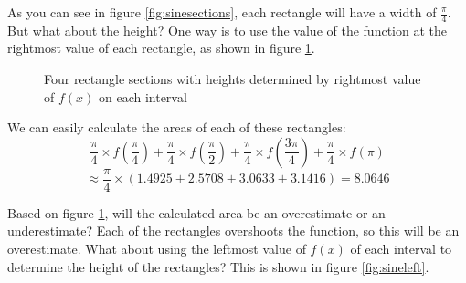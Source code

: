 As you can see in figure \ref{fig:sinesections}, each rectangle will have a width of $\frac{\pi}{4}$. But what about the height? One way is to use the value of the function at the rightmost value of each rectangle, as shown in figure \ref{fig:sineright}. 

\begin{figure}[htbp]
	\centering
	\caption{Four rectangle sections with heights determined by rightmost value of $f(x)$ on each interval}
	\label{fig:sineright}
\end{figure}

We can easily calculate the areas of each of these rectangles:
$$\frac{\pi}{4} \times f(\frac{\pi}{4}) + \frac{\pi}{4} \times f(\frac{\pi}{2}) + \frac{\pi}{4} \times  f(\frac{3\pi}{4}) + \frac{\pi}{4} \times f(\pi)$$
$$\approx \frac{\pi}{4} \times (1.4925 + 2.5708 + 3.0633 + 3.1416) = 8.0646$$

Based on figure \ref{fig:sineright}, will the calculated area be an overestimate or an underestimate? Each of the rectangles overshoots the function, so this will be an overestimate. What about using the leftmost value of $f(x)$ of each interval to determine the height of the rectangles? This is shown in figure \ref{fig:sineleft}.

